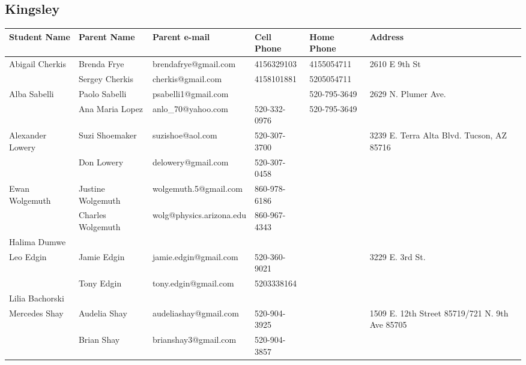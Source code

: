 \documentclass[landscape]{article}\usepackage[]{graphicx}\usepackage[]{color}
\begin{document}
\subsection{Kingsley}
\begin{longtable}{|p{100pt}|p{100pt}|p{140pt}|p{60pt}|p{64pt}|p{120pt}|}
\textbf{Student Name} & \textbf{Parent Name} & \textbf{Parent e-mail} & \textbf{Cell Phone} & \textbf{Home Phone} & \textbf{Address}\\
\hline
\hline
\multirow{2}{100pt}{Abigail Cherkis} & Brenda Frye & brendafrye@gmail.com & 4156329103 & 4155054711 & \multirow{2}{120pt}{2610 E 9th St} \\
 & Sergey Cherkis & cherkis@gmail.com & 4158101881 & 5205054711 & \\
\hline
\multirow{2}{100pt}{Alba Sabelli} & Paolo Sabelli & psabelli1@gmail.com &  & 520-795-3649 & \multirow{2}{120pt}{2629 N. Plumer Ave.} \\
 & Ana Maria Lopez & anlo\_70@yahoo.com & 520-332-0976 & 520-795-3649 & \\
\hline
\multirow{2}{100pt}{Alexander Lowery} & Suzi Shoemaker & suzishoe@aol.com & 520-307-3700 &  & \multirow{2}{120pt}{3239 E. Terra Alta Blvd.  Tucson, AZ 85716} \\
 & Don Lowery & delowery@gmail.com & 520-307-0458 &  & \\
\hline
\multirow{2}{100pt}{Ewan Wolgemuth} & Justine Wolgemuth & wolgemuth.5@gmail.com & 860-978-6186 &  & \multirow{2}{120pt}{} \\
 & Charles Wolgemuth & wolg@physics.arizona.edu & 860-967-4343 &  & \\
\hline
\multirow{2}{100pt}{Halima Dumwe} &  &  &  &  & \multirow{2}{120pt}{} \\
 &  &  &  &  & \\
\hline
\multirow{2}{100pt}{Leo Edgin} & Jamie Edgin & jamie.edgin@gmail.com & 520-360-9021 &  & \multirow{2}{120pt}{3229 E. 3rd St.} \\
 & Tony Edgin & tony.edgin@gmail.com & 5203338164 &  & \\
\hline
\multirow{2}{100pt}{Lilia Bachorski} &  &  &  &  & \multirow{2}{120pt}{} \\
 &  &  &  &  & \\
\hline
\multirow{2}{100pt}{Mercedes Shay} & Audelia Shay  & audeliashay@gmail.com & 520-904-3925 &  & \multirow{2}{120pt}{1509 E. 12th Street 85719/721 N. 9th Ave 85705} \\
 & Brian Shay & brianshay3@gmail.com & 520-904-3857 &  & \\

\end{longtable}
\end{document}
